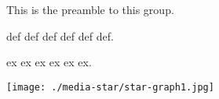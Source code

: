 This is the preamble to this group.
\begin{group}
  
\begin{definition}
\label{def:title}
  def def def
  def
  def def.
\end{definition}



\begin{example}
\label{ex:title}
  ex ex ex
  ex
  ex ex.
  \begin{center}
  \texttt{[image: ./media-star/star-graph1.jpg]}
  \end{center}
\end{example}
\end{group}
